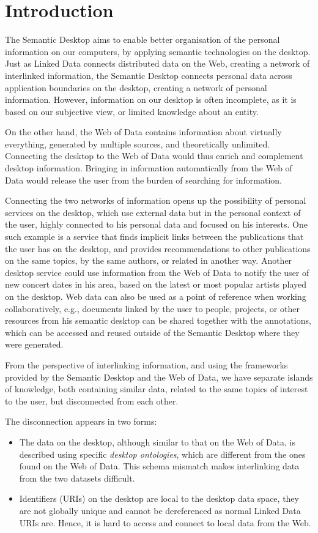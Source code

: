 \section{Introduction}
\label{sec:sdwodintro}

The Semantic Desktop aims to enable better organisation of the personal information on our computers, by applying semantic technologies on the desktop. Just as Linked Data connects distributed data on the Web, creating a network of interlinked information, the Semantic Desktop connects personal data across application boundaries on the desktop, creating a network of personal information.
However, information on our desktop is often incomplete, as it is based on our subjective view, or limited knowledge about an entity.

On the other hand, the Web of Data contains information about virtually everything, generated by multiple sources, and theoretically unlimited. Connecting the desktop to the Web of Data would thus enrich and complement desktop information. Bringing in information automatically from the Web of Data would release the user from the burden of searching for information.

Connecting the two networks of information opens up the possibility of personal services on the desktop, which use external data but in the personal context of the user, highly connected to his personal data and focused on his interests. One such example is a service that finds implicit links between the publications that the user has on the desktop, and provides recommendations to other publications on the same topics, by the same authors, or related in another way. 
Another desktop service could use information from the Web of Data to notify the user of new concert dates in his area, based on the latest or most popular artists played on the desktop. 
Web data can also be used as a point of reference when working collaboratively, e.g., documents linked by the user to people, projects, or other resources from his semantic desktop can be shared together with the annotations, which can be accessed and reused outside of the Semantic Desktop where they were generated.

From the perspective of interlinking information, and using the frameworks provided by the Semantic Desktop and the Web of Data, we have separate islands of knowledge, both containing similar data, related to the same topics of interest to the user, but disconnected from each other. 

The disconnection appears in two forms:
\begin{itemize}
 \item The data on the desktop, although similar to that on the Web of Data, is described using specific \emph{desktop ontologies}, which are different from the ones found on the Web of Data. This schema mismatch makes interlinking data from the two datasets difficult.
 \item Identifiers (URIs) on the desktop are local to the desktop data space, they are not globally unique and cannot be dereferenced as normal Linked Data URIs are. Hence, it is hard to access and connect to local data from the Web.
\end{itemize}


